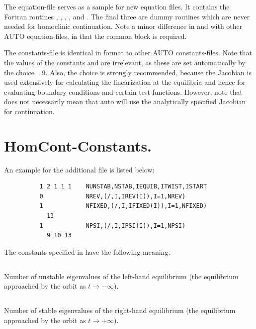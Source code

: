 \documentclass[12pt]{report}
\begin{document}
The equation-file  serves as a sample for new equation
files. It contains the Fortran routines 
, , , ,  
and . The final three are
dummy routines which are never needed for homoclinic continuation.
Note a minor difference in  and  with other 
{\cal AUTO} equation-files, in that the common block 
 is required.

The constants-file  is identical in format to other
{\cal AUTO} constants-files. Note that the values of the constants
 and  are irrelevant, as these are set
automatically by the choice =9. Also, the choice 
is strongly recommended, because the Jacobian is used extensively for
calculating the linearization at the equilibria and hence for
evaluating boundary conditions and certain test functions. However,
note that  does not necessarily mean that {\cal auto} will
use the analytically specified Jacobian for continuation.

\section{ {\cal HomCont}-Constants.} \label{sec:HomCont_Constants}
An example for the additional file  is listed below:
\begin{verbatim}
          1 2 1 1 1    NUNSTAB,NSTAB,IEQUIB,ITWIST,ISTART
          0            NREV,(/,I,IREV(I)),I=1,NREV)
          1            NFIXED,(/,I,IFIXED(I)),I=1,NFIXED)
            13
          1            NPSI,(/,I,IPSI(I)),I=1,NPSI)
            9 10 13
\end{verbatim}
The constants specified in  have the following meaning. 

\subsection{}  \label{sec:NUNSTAB}

Number of unstable eigenvalues of the left-hand equilibrium (the equilibrium 
approached by the orbit as $t \to -\infty$).


\subsection{}  \label{sec:NSTAB}
Number of stable eigenvalues of the right-hand equilibrium (the equilibrium
approached by the orbit as $t \to +\infty$).
\end{document}

